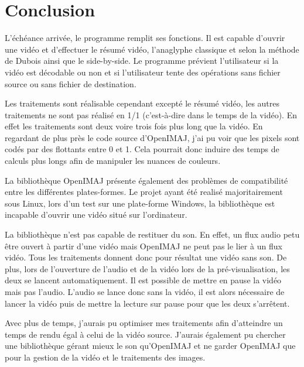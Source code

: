 \documentclass[10pt,a4paper]{article}
\begin{document}
\section{Conclusion}

L'échéance arrivée, le programme remplit ses fonctions. Il est capable d'ouvrir une vidéo et d'effectuer le résumé vidéo, l'anaglyphe classique et selon la méthode de Dubois ainsi que le side-by-side. Le programme prévient l'utilisateur si la vidéo est décodable ou non et si l'utilisateur tente des opérations sans fichier source ou sans fichier de destination.

Les traitements sont réalisable cependant excepté le résumé vidéo, les autres traitements ne sont pas réalisé en 1/1 (c'est-à-dire dans le temps de la vidéo). En effet les traitements sont deux voire trois fois plus long que la vidéo. En regardant de plus près le code source d'OpenIMAJ, j'ai pu voir que les pixels sont codés par des flottants entre  0 et 1. Cela pourrait donc induire des temps de calculs plus longs afin de manipuler les nuances de couleurs.

La bibliothèque OpenIMAJ présente également des problèmes de compatibilité entre les différentes plates-formes. Le projet ayant été realisé majoritairement sous Linux, lors d'un test sur une plate-forme Windows, la bibliothèque est incapable d'ouvrir une vidéo situé sur l'ordinateur.

La bibliothèque n'est pas capable de restituer du son. En effet, un flux audio petu être ouvert à partir d'une vidéo mais OpenIMAJ ne peut pas le lier à un flux vidéo. Tous les traitements donnent donc pour résultat une vidéo sans son. De plus, lors de l'ouverture de l'audio et de la vidéo lors de la pré-visualisation, les deux se lancent automatiquement. Il est possible de mettre en pause la vidéo mais pas l'audio. L'audio se lance donc sans la vidéo, il est alors nécessaire de lancer la vidéo puis de mettre la lecture sur pause pour que les deux s'arrêtent.

Avec plus de temps, j'aurais pu optimiser mes traitements afin d'atteindre un temps de rendu égal à celui de la vidéo source. J'aurais également pu chercher une bibliothèque gérant mieux le son qu'OpenIMAJ et ne garder OpenIMAJ que pour la gestion de la vidéo et le traitements des images.





\newpage

\end{document}
